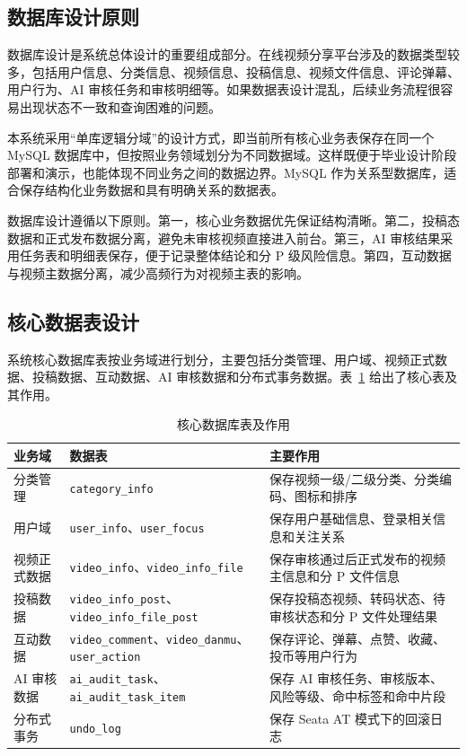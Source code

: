 \subsection{数据库设计原则}
\label{subsec:database-design-principles}

数据库设计是系统总体设计的重要组成部分。在线视频分享平台涉及的数据类型较多，包括用户信息、分类信息、视频信息、投稿信息、视频文件信息、评论弹幕、用户行为、AI 审核任务和审核明细等。如果数据表设计混乱，后续业务流程很容易出现状态不一致和查询困难的问题。

本系统采用“单库逻辑分域”的设计方式，即当前所有核心业务表保存在同一个 MySQL 数据库中，但按照业务领域划分为不同数据域。这样既便于毕业设计阶段部署和演示，也能体现不同业务之间的数据边界。MySQL 作为关系型数据库，适合保存结构化业务数据和具有明确关系的数据表\cite{mysqldocs}。

数据库设计遵循以下原则。第一，核心业务数据优先保证结构清晰。第二，投稿态数据和正式发布数据分离，避免未审核视频直接进入前台。第三，AI 审核结果采用任务表和明细表保存，便于记录整体结论和分 P 级风险信息。第四，互动数据与视频主数据分离，减少高频行为对视频主表的影响。

\subsection{核心数据表设计}
\label{subsec:core-table-design}

系统核心数据库表按业务域进行划分，主要包括分类管理、用户域、视频正式数据、投稿数据、互动数据、AI 审核数据和分布式事务数据。表~\ref{tab:core-database-tables} 给出了核心表及其作用。

\begin{table}[htbp]
  \centering
  \caption{核心数据库表及作用}
  \label{tab:core-database-tables}
  \begin{tabular}{p{}p{}p{}}
    \hline
    \textbf{业务域} & \textbf{数据表} & \textbf{主要作用} \\
    \hline
    分类管理 & \texttt{category\_info} & 保存视频一级/二级分类、分类编码、图标和排序 \\
    用户域 & \texttt{user\_info}、\texttt{user\_focus} & 保存用户基础信息、登录相关信息和关注关系 \\
    视频正式数据 & \texttt{video\_info}、\texttt{video\_info\_file} & 保存审核通过后正式发布的视频主信息和分 P 文件信息 \\
    投稿数据 & \texttt{video\_info\_post}、\texttt{video\_info\_file\_post} & 保存投稿态视频、转码状态、待审核状态和分 P 文件处理结果 \\
    互动数据 & \texttt{video\_comment}、\texttt{video\_danmu}、\texttt{user\_action} & 保存评论、弹幕、点赞、收藏、投币等用户行为 \\
    AI 审核数据 & \texttt{ai\_audit\_task}、\texttt{ai\_audit\_task\_item} & 保存 AI 审核任务、审核版本、风险等级、命中标签和命中片段 \\
    分布式事务 & \texttt{undo\_log} & 保存 Seata AT 模式下的回滚日志 \\
    \hline
  \end{tabular}
\end{table}

